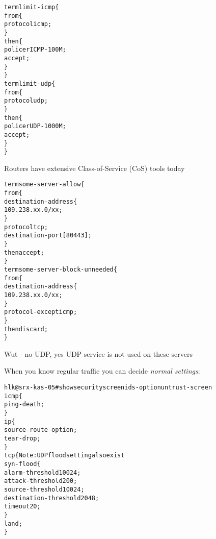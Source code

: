 \documentclass[Screen16to9,17pt]{foils}
\begin{document}

\begin{alltt}\footnotesize
term limit-icmp \{
    from \{
        protocol icmp;
    \}
    then \{
        policer ICMP-100M;
        accept;
    \}
\}
term limit-udp \{
    from \{
        protocol udp;
    \}
    then \{
        policer UDP-1000M;
        accept;
    \}
\}
\end{alltt}

Routers have extensive Class-of-Service (CoS) tools today


\begin{alltt}\footnotesize
term some-server-allow \{
    from \{
        destination-address \{
            109.238.xx.0/xx;
        \}
        protocol tcp;
        destination-port [ 80 443 ];
    \}
    then accept;
\}
term some-server-block-unneeded \{
    from \{
        destination-address \{
            109.238.xx.0/xx;
        \}
        protocol-except icmp;
    \}
    then discard;
\}
\end{alltt}

Wut - no UDP, yes UDP service is not used on these servers



When you know regular traffic you can decide \emph{normal settings}:

\begin{alltt}\footnotesize
hlk@srx-kas-05# show security screen ids-option untrust-screen
icmp \{
    ping-death;
\}
ip \{
    source-route-option;
    tear-drop;
\}
tcp \{    Note: UDP flood setting also exist
    syn-flood \{
        alarm-threshold 10024;
        attack-threshold 200;
        source-threshold 10024;
        destination-threshold 2048;
        timeout 20;
    \}
    land;
\}
\end{alltt}

\slidenext{}
\end{document}
